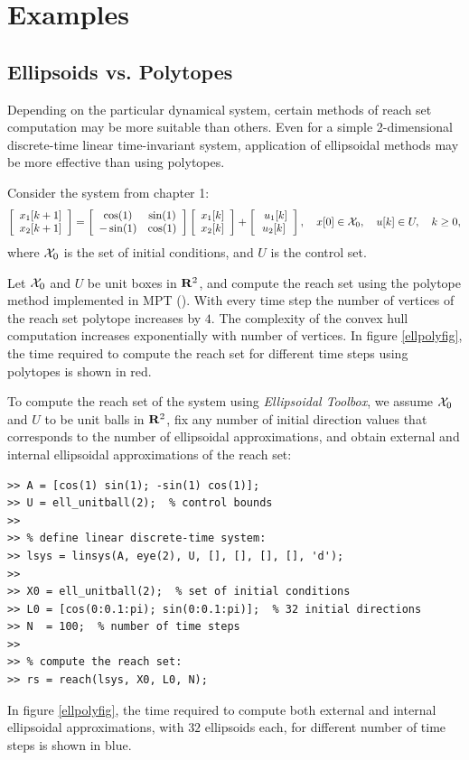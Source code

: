 \documentclass{report}
\newcommand{\XX}{{\cal X}}
\begin{document}
\chapter{Examples}
\section{Ellipsoids vs. Polytopes}
Depending on the particular dynamical system, certain methods of
reach set computation may be more suitable than others.
Even for a simple 2-dimensional discrete-time linear time-invariant
system, application of ellipsoidal methods may be more effective
than using polytopes.

Consider the system from chapter 1:
\[ \left[\begin{array}{c}
x_1[k+1]\\
x_2[k+1]\end{array}\right] = \left[\begin{array}{cc}
\cos(1) & \sin(1)\\
-\sin(1) & \cos(1)\end{array}\right]\left[\begin{array}{c}
x_1[k]\\
x_2[k]\end{array}\right] + \left[\begin{array}{c}\
u_1[k]\\
u_2[k]\end{array}\right], ~~~ x[0]\in\XX_0, ~~~ u[k]\in U, ~~~ k\geq0, \]
where $\XX_0$ is the set of initial conditions, and $U$ is the control set.

Let $\XX_0$ and $U$ be unit boxes in ${\bf R}^2$, and compute the reach set
using the polytope method implemented in MPT (\cite{mpt}). With every time step
the number of vertices of the reach set polytope increases by $4$.
The complexity of the
convex hull computation increases exponentially with number of vertices.
In figure \ref{ellpolyfig}, the time required to compute the reach set
for different time steps using polytopes is shown in red.

To compute the reach set of the system using {\it Ellipsoidal Toolbox},
we assume $\XX_0$ and $U$ to be unit balls in ${\bf R}^2$, fix any number
of initial direction values that corresponds to the number of ellipsoidal
approximations, and obtain external and internal ellipsoidal approximations
of the reach set:
{\tt \begin{verbatim}
>> A = [cos(1) sin(1); -sin(1) cos(1)];
>> U = ell_unitball(2);  % control bounds
>>
>> % define linear discrete-time system:
>> lsys = linsys(A, eye(2), U, [], [], [], [], 'd');
>>
>> X0 = ell_unitball(2);  % set of initial conditions
>> L0 = [cos(0:0.1:pi); sin(0:0.1:pi)];  % 32 initial directions
>> N  = 100;  % number of time steps
>>
>> % compute the reach set:
>> rs = reach(lsys, X0, L0, N);
\end{verbatim}}
In figure \ref{ellpolyfig}, the time required to compute both external
and internal ellipsoidal approximations, with $32$ ellipsoids each,
for different number of time steps is shown in blue.
\end{document}

